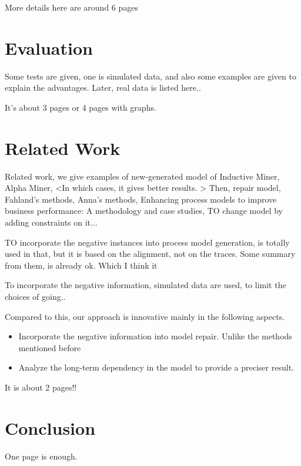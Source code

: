 \documentclass[]{article}
\begin{document}
More details here are around 6 pages
\section{Evaluation}
Some tests are given, one is simulated data, and also some examples are given to explain the advantages. Later, real data is listed here.. 

It's about 3 pages or 4 pages with graphs. 

\section{Related Work}

Related work, we give examples of new-generated model of Inductive Miner, Alpha Miner, <In which cases, it gives better results. > 
Then, repair model, 
Fahland's methods,  
Anna's methods,
Enhancing process models to improve business performance: A methodology and case studies, TO change model by adding constraints on it... 

TO incorporate the negative instances into process model generation, is totally used in that, but it is based on the alignment, not on the traces.  Some summary from them, is already ok. 
Which I think it 

To incorporate the negative information, simulated data are used, to limit the choices of going..

Compared to this, our approach is innovative mainly in the following aspects. 
\begin{itemize}
	\item Incorporate the negative information into model repair. Unlike the methods mentioned before
	\item Analyze the long-term dependency in the model to provide a preciser result. 
\end{itemize}

It is about 2 pages!!
\section{Conclusion}
One page is enough. 


\end{document}
